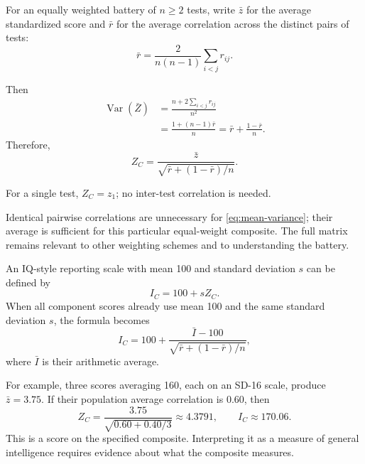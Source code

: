 \documentclass[
  a4paper,fontsize=11pt,parskip=half,headings=small,
  numbers=noenddot,bibliography=totoc
]{scrartcl}
\DeclareMathOperator{\Var}{Var}
\begin{document}
For an equally weighted battery of \(n\geq2\) tests, write \(\bar z\) for the
average standardized score and \(\bar r\) for the average correlation across
the distinct pairs of tests:
\begin{equation}
  \bar r=\frac{2}{n(n-1)}\sum_{i<j}r_{ij}.
  \label{eq:average-correlation}
\end{equation}
\begin{samepage}
Then
\begin{equation}
  \begin{aligned}
    \Var(\bar Z)
    &=\frac{n+2\sum_{i<j}r_{ij}}{n^2}\\
    &=\frac{1+(n-1)\bar r}{n}
     =\bar r+\frac{1-\bar r}{n}.
  \end{aligned}
  \label{eq:mean-variance}
\end{equation}
Therefore,
\begin{equation}
  \boxed{Z_C=\frac{\bar z}{\sqrt{\bar r+(1-\bar r)/n}}.}
  \label{eq:equal-composite}
\end{equation}
\end{samepage}
For a single test, \(Z_C=z_1\); no inter-test correlation is needed.

Identical pairwise correlations are unnecessary for
\cref{eq:mean-variance}; their average is sufficient for this particular
equal-weight composite. The full matrix remains relevant to other weighting
schemes and to understanding the battery.

An IQ-style reporting scale with mean 100 and standard deviation \(s\) can
be defined by
\begin{equation}
  I_C=100+sZ_C.
  \label{eq:reporting-scale}
\end{equation}
When all component scores already use mean 100 and the same standard
deviation \(s\), the formula becomes
\begin{equation}
  I_C=100+\frac{\bar I-100}{\sqrt{\bar r+(1-\bar r)/n}},
  \label{eq:iq-composite}
\end{equation}
where \(\bar I\) is their arithmetic average.

For example, three scores averaging 160, each on an SD-16 scale, produce
\(\bar z=3.75\). If their population average correlation is 0.60, then
\begin{equation}
  Z_C=\frac{3.75}{\sqrt{0.60+0.40/3}}\approx4.3791,
  \qquad I_C\approx170.06.
  \label{eq:worked-example}
\end{equation}
This is a score on the specified composite. Interpreting it as a measure of
general intelligence requires evidence about what the composite measures.
\end{document}
